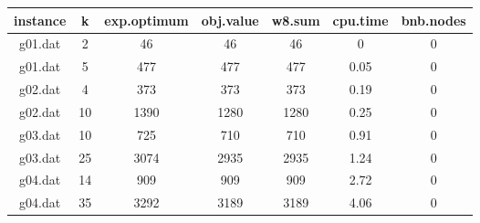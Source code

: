 \begin{tabular}{ c | c | c | c | c | c | c }
	instance & k & exp.optimum & obj.value & w8.sum & cpu.time & bnb.nodes \\ 
	\hline
	g01.dat & 2 & 46 & 46 & 46 & 0 & 0 \\
	g01.dat & 5 & 477 & 477 & 477 & 0.05 & 0 \\
	g02.dat & 4 & 373 & 373 & 373 & 0.19 & 0 \\
	g02.dat & 10 & 1390 & 1280 & 1280 & 0.25 & 0 \\
	g03.dat & 10 & 725 & 710 & 710 & 0.91 & 0 \\
	g03.dat & 25 & 3074 & 2935 & 2935 & 1.24 & 0 \\
	g04.dat & 14 & 909 & 909 & 909 & 2.72 & 0 \\
	g04.dat & 35 & 3292 & 3189 & 3189 & 4.06 & 0 \\
\end{tabular}
